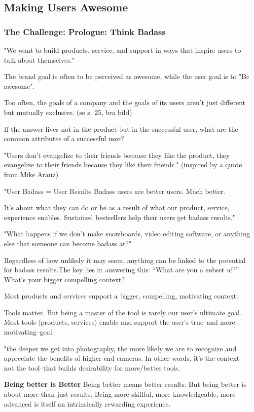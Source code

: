 \subsection{Making Users Awesome}
\subsubsection{The Challenge: Prologue: Think Badass}
"We want to build products, service, and support in ways that inspire users to talk about themselves."

The brand goal is often to be perceived as awesome, while the user goal is to "Be awesome".

Too often, the goals of a company and the goals of its users aren’t just different but mutually exclusive. (se s. 25, bra bild)

If the answer lives not in the product but in the successful user, what are the common attributes of a successful user?

"Users don’t evangelize to their friends because they like the product, they evangelize to their friends because they like
their friends." (inspired by a quote from Mike Arauz)

"User Badass = User Results Badass users are better users. Much better.

It’s about what they can do or be as a result of what our product, service, experience enables.
Sustained bestsellers help their users get badass results."

"What happens if we don’t make snowboards, video editing software, or anything else that someone can become badass at?"

Regardless of how unlikely it may seem, anything can be linked to the potential for badass results.The key lies in answering this:
“What are you a subset of?” What’s your bigger compelling context?

Most products and services support a bigger, compelling, motivating context.

Tools matter. But being a master of the tool is rarely our user’s ultimate goal. Most tools (products, services) enable and support the user’s true–and more motivating–goal.

"the deeper we get into photography, the more likely we are to recognize and appreciate the benefits of higher-end cameras.
In other words, it’s the context– not the tool–that builds desirability for more/better tools.

\textbf{Being better is Better}
Being better means better results.
But being better is about more than just results. Being more skillful, more knowledgeable, more advanced is itself an intrinsically rewarding experience.

